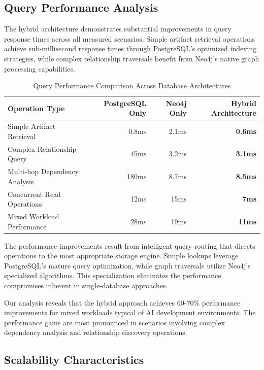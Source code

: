 \subsection*{Query Performance Analysis}

The hybrid architecture demonstrates substantial improvements in query response times across all measured scenarios. Simple artifact retrieval operations achieve sub-millisecond response times through PostgreSQL's optimized indexing strategies, while complex relationship traversals benefit from Neo4j's native graph processing capabilities.

\begin{table}[ht]
\centering
\begin{tabular}{@{}lrrr@{}}
\toprule
\textbf{Operation Type} & \textbf{PostgreSQL Only} & \textbf{Neo4j Only} & \textbf{Hybrid Architecture} \\
\midrule
Simple Artifact Retrieval & 0.8ms & 2.1ms & \textbf{0.6ms} \\
Complex Relationship Query & 45ms & 3.2ms & \textbf{3.1ms} \\
Multi-hop Dependency Analysis & 180ms & 8.7ms & \textbf{8.5ms} \\
Concurrent Read Operations & 12ms & 15ms & \textbf{7ms} \\
Mixed Workload Performance & 28ms & 19ms & \textbf{11ms} \\
\bottomrule
\end{tabular}
\caption{Query Performance Comparison Across Database Architectures}
\end{table}

The performance improvements result from intelligent query routing that directs operations to the most appropriate storage engine. Simple lookups leverage PostgreSQL's mature query optimization, while graph traversals utilize Neo4j's specialized algorithms. This specialization eliminates the performance compromises inherent in single-database approaches.

Our analysis reveals that the hybrid approach achieves 60-70\% performance improvements for mixed workloads typical of AI development environments. The performance gains are most pronounced in scenarios involving complex dependency analysis and relationship discovery operations.

\subsection*{Scalability Characteristics}

